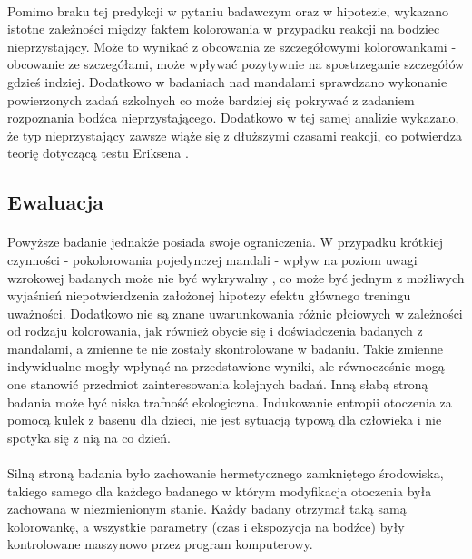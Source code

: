 \documentclass[12pt,a4paper,final,oneside,onecolumn,titlepage]{article}
\begin{document}
\paragraph{}
Pomimo braku tej predykcji w pytaniu badawczym oraz w hipotezie, wykazano istotne zależności między faktem kolorowania w przypadku reakcji na bodziec nieprzystający. Może to wynikać z obcowania ze szczegółowymi kolorowankami - obcowanie ze szczegółami, może wpływać pozytywnie na spostrzeganie szczegółów gdzieś indziej. Dodatkowo w badaniach nad mandalami sprawdzano wykonanie powierzonych zadań szkolnych \citep{carsley_effectiveness_2018} co może bardziej się pokrywać z zadaniem rozpoznania bodźca nieprzystającego. Dodatkowo w tej samej analizie wykazano, że typ nieprzystający zawsze wiąże się z dłuższymi czasami reakcji, co potwierdza teorię dotyczącą testu Eriksena \citep{sanders_eriksen_2002}.
\subsection*{\normalsize{\textbf{Ewaluacja}}}
\paragraph{}
Powyższe badanie jednakże posiada swoje ograniczenia. W przypadku krótkiej czynności - pokolorowania pojedynczej mandali - wpływ na poziom uwagi wzrokowej badanych może nie być wykrywalny \citep{thompson_influence_2021}, co może być jednym z możliwych wyjaśnień niepotwierdzenia założonej hipotezy efektu głównego treningu uważności. Dodatkowo nie są znane uwarunkowania różnic płciowych w zależności od rodzaju kolorowania, jak również obycie się i doświadczenia badanych z mandalami, a zmienne te nie zostały skontrolowane w badaniu. Takie zmienne indywidualne mogły wpłynąć na przedstawione wyniki, ale równocześnie mogą one stanowić przedmiot zainteresowania kolejnych badań. Inną słabą stroną badania może być niska trafność ekologiczna. Indukowanie entropii otoczenia za pomocą kulek z basenu dla dzieci, nie jest sytuacją typową dla człowieka i nie spotyka się z nią na co dzień.
\paragraph{}
Silną stroną badania było zachowanie hermetycznego zamkniętego środowiska, takiego samego dla każdego badanego w którym modyfikacja otoczenia była zachowana w niezmienionym stanie. Każdy badany otrzymał taką samą kolorowankę, a wszystkie parametry (czas i ekspozycja na bodźce) były kontrolowane maszynowo przez program komputerowy.
\newpage

\newpage
\end{document}
